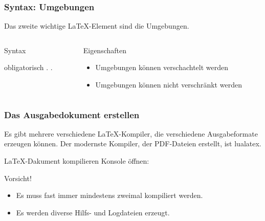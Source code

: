 \begin{frame}[fragile]
    \frametitle{Syntax: Umgebungen}
    Das zweite wichtige \LaTeX-Element sind die Umgebungen.
    \begin{columns}[T]
        \begin{column}{0.47\textwidth}
            \begin{block}{Syntax}
                \begin{lstverbatim}
                \begin{Umgebung}[optional]
                                {obligatorisch}
                    .
                    .
                \end{Umgebung}
                \end{lstverbatim}
                \vspace{0.4cm}
            \end{block}
        \end{column}
        \begin{column}{0.47\textwidth}
            \begin{block}{Eigenschaften}
                \begin{itemize}
                    \item Umgebungen können verschachtelt werden
                    \item Umgebungen können \alert{nicht} verschränkt werden
                \end{itemize}
            \end{block}
        \end{column}
    \end{columns}
\end{frame}

\begin{frame}[fragile]
    \frametitle{Das Ausgabedokument erstellen}
    Es gibt mehrere verschiedene \LaTeX-Kompiler, die verschiedene Ausgabeformate erzeugen können.
    Der modernste Kompiler, der PDF-Dateien erstellt, ist \alert{lualatex}.

    \begin{block}{\LaTeX-Dakument kompilieren}
        Konsole öffnen:
    \end{block}
    \begin{alertblock}{Vorsicht!}
        \begin{itemize}
        \item Es muss fast immer mindestens zweimal kompiliert werden.
        \item Es werden diverse Hilfs- und Logdateien erzeugt.
        \end{itemize}
    \end{alertblock}
\end{frame}
